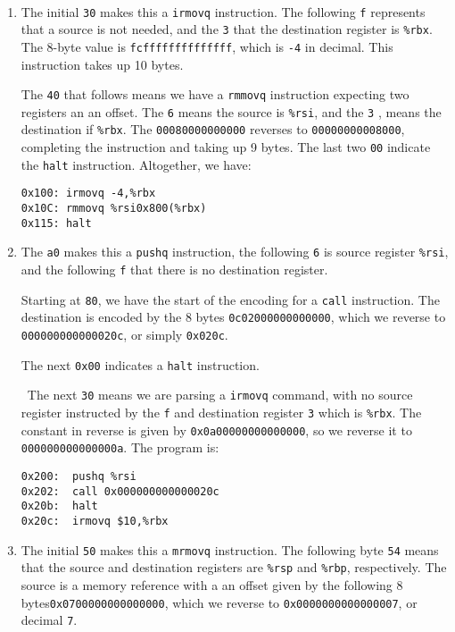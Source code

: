 \documentclass[12pt]{article}
\newenvironment{sol}[1][Solution]{\begin{trivlist}
		\item[\hskip \labelsep {\bfseries #1:}]}{\end{trivlist}}
\begin{document}
\begin{sol}
	\
	\begin{enumerate}[label=(\alph*)]
		\item The initial \texttt{30} makes this a \texttt{irmovq}
		instruction. The following \texttt{f} represents that a source
		is not needed, and the \texttt{3} that the destination register
		is \texttt{\%rbx}. The 8-byte value is \texttt{fcffffffffffffff},
		which is \texttt{-4} in decimal. This instruction takes up 10 bytes.
		
		The \texttt{40} that follows means
		we have a \texttt{rmmovq} instruction expecting two registers an
		an offset. The \texttt{6} means the source is \texttt{\%rsi},
		and the \texttt{3} , means the destination if \texttt{\%rbx}.
		The \texttt{00080000000000} reverses to \texttt{00000000008000},
		completing the instruction and taking up 9 bytes.
		The last two \texttt{00} indicate the \texttt{halt} instruction.
		Altogether, we have:
		\begin{lstlisting}[language={}]
0x100: irmovq -4,%rbx
0x10C: rmmovq %rsi0x800(%rbx)
0x115: halt
		\end{lstlisting}
		\item The \texttt{a0} makes this a \texttt{pushq} instruction,
		the following \texttt{6} is source register \texttt{\%rsi}, and the
		following \texttt{f} that there is no destination register.
		
		Starting at \texttt{80}, we have the start of the encoding for
		a \texttt{call} instruction. The destination is encoded by
		the 8 bytes \texttt{0c02000000000000}, which we reverse to
		\texttt{000000000000020c}, or simply \texttt{0x020c}.
		
		The next \texttt{0x00} indicates a \texttt{halt} instruction.
		
		\
		The next \texttt{30} means we are parsing a \texttt{irmovq} command,
		with no source register instructed by the \texttt{f} and destination
		register \texttt{3} which is \texttt{\%rbx}. The constant in reverse
		is given by \texttt{0x0a00000000000000}, so we reverse it to
		\texttt{000000000000000a}. The program is:
		\begin{lstlisting}[language={}]
0x200:	pushq %rsi
0x202:	call 0x000000000000020c
0x20b:	halt
0x20c:	irmovq $10,%rbx
		\end{lstlisting} 
		\item The initial \texttt{50} makes this a \texttt{mrmovq}
		instruction. The following byte \texttt{54} means that the
		source and destination registers are \texttt{\%rsp} and
		\texttt{\%rbp}, respectively. The source is a memory reference
		with a an offset given by the following 8 bytes\texttt{0x0700000000000000},
		which we reverse to \texttt{0x0000000000000007}, or decimal \texttt{7}.
		

\end{enumerate}
\end{sol}
\end{document}
